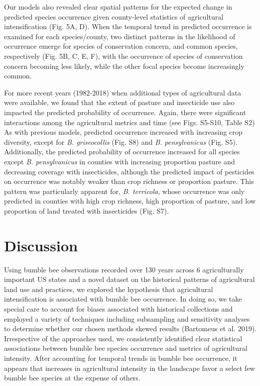 \documentclass[11pt,]{article}
\begin{document}
Our models also revealed clear spatial patterns for the expected change
in predicted species occurrence given county-level statistics of
agricultural intensification (Fig. 5A, D). When the temporal trend in
predicted occurrence is examined for each species/county, two distinct
patterns in the likelihood of occurrence emerge for species of
conservation concern, and common species, respectively (Fig. 5B, C, E,
F), with the occurrence of species of conservation concern becoming less
likely, while the other focal species become increasingly common.

For more recent years (1982-2018) when additional types of agricultural
data were available, we found that the extent of pasture and insecticide
use also impacted the predicted probability of occurrence. Again, there
were significant interactions among the agricultural metrics and time
(see Figs. S5-S10, Table S2) As with previous models, predicted
occurrence increased with increasing crop diversity, except for \emph{B.
griseocollis} (Fig. S8) and \emph{B. pensylvanicus} (Fig. S5).
Additionally, the predicted probability of occurrence increased for all
species except \emph{B. pensylvanicus} in counties with increasing
proportion pasture and decreasing coverage with insecticides, although
the predicted impact of pesticides on occurrence was notably weaker than
crop richness or proportion pasture. This pattern was particularly
apparent for, \emph{B. terricola}, whose occurrence was only predicted
in counties with high crop richness, high proportion of pasture, and low
proportion of land treated with insecticides (Fig. S7).

\hypertarget{discussion}{%
\section{Discussion}\label{discussion}}

Using bumble bee observations recorded over 130 years across 6
agriculturally important US states and a novel dataset on the historical
patterns of agricultural land use and practices, we explored the
hypothesis that agricultural intensification is associated with bumble
bee occurrence. In doing so, we take special care to account for biases
associated with historical collections and employed a variety of
techniques including subsampling and sensitivity analyses to determine
whether our chosen methods skewed results (Bartomeus et al. 2019).
Irrespective of the approaches used, we consistently identified clear
statistical associations between bumble bee species occurrence and
metrics of agricultural intensity. After accounting for temporal trends
in bumble bee occurrence, it appears that increases in agricultural
intensity in the landscape favor a select few bumble bee species at the
expense of others.
\end{document}
